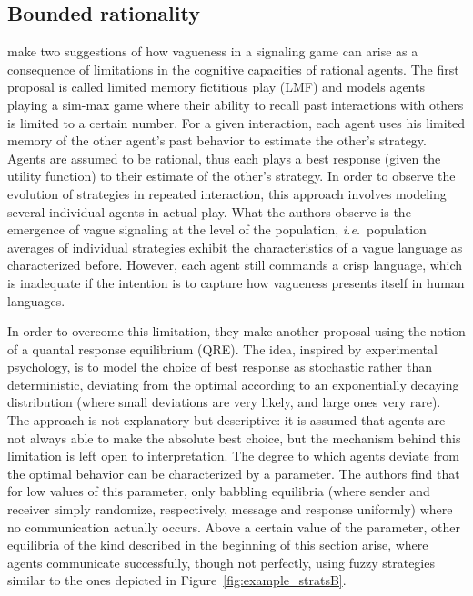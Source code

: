 \documentclass[a4paper]{article}
\begin{document}
\subsection{Bounded rationality}
\textcite{franke_vagueness_2011} make two suggestions of how vagueness in a signaling game can arise as a consequence of limitations in the cognitive capacities of rational agents.
The first proposal is called limited memory fictitious play (LMF) and models agents playing a sim-max game where their ability to recall past interactions with others is limited to a certain number.
For a given interaction, each agent uses his limited memory of the other agent's past behavior to estimate the other's strategy.
Agents are assumed to be rational, thus each plays a best response (given the utility function) to their estimate of the other's strategy.
In order to observe the evolution of strategies in repeated interaction, this approach involves modeling several individual agents in actual play.
What the authors observe is the emergence of vague signaling at the level of the population, \emph{i.e.}~population averages of individual strategies exhibit the characteristics of a vague language as characterized before.
However, each agent still commands a crisp language, which is inadequate if the intention is to capture how vagueness presents itself in human languages.

In order to overcome this limitation, they make another proposal using the notion of a quantal response equilibrium (QRE).
The idea, inspired by experimental psychology, is to model the choice of best response as stochastic rather than deterministic, deviating from the optimal according to an exponentially decaying distribution (where small deviations are very likely, and large ones very rare).
The approach is not explanatory but descriptive: it is assumed that agents are not always able to make the absolute best choice, but the mechanism behind this limitation is left open to interpretation.
The degree to which agents deviate from the optimal behavior can be characterized by a parameter.
The authors find that for low values of this parameter, only babbling equilibria (where sender and receiver simply randomize, respectively, message and response uniformly) where no communication actually occurs.
Above a certain value of the parameter, other equilibria of the kind described in the beginning of this section arise, where agents communicate successfully, though not perfectly, using fuzzy strategies similar to the ones depicted in Figure~\ref{fig:example_stratsB}.
\end{document}
